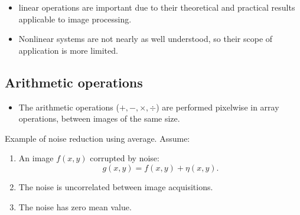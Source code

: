
\begin{frame}
\begin{itemize}
\item linear operations are important due to their theoretical and practical results applicable to image processing.
\item Nonlinear systems are not nearly as well understood, so their scope of application is more limited.
\end{itemize}
\end{frame}


\subsection{Arithmetic operations}


\begin{frame}
\begin{itemize}
\item The arithmetic operations ($+,-,\times, \div$) are performed pixelwise in array operations, between images of the same size.
\end{itemize}
Example of noise reduction using average. Assume:
\begin{enumerate}
\item An image $f(x,y)$ corrupted by noise:
\begin{equation}
g(x,y) = f(x,y) + \eta(x,y).
\end{equation}
\item The noise is uncorrelated between image acquisitions.
\item The noise has zero mean value.
\end{enumerate}
\end{frame}



